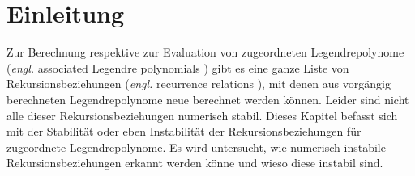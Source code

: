 %
%
%
\section{Einleitung\label{legendre:section:einleitung}}
Zur Berechnung respektive zur Evaluation von zugeordneten Legendrepolynome (\textit{engl.} associated Legendre polynomials ) gibt es eine ganze Liste von Rekursionsbeziehungen (\textit{engl.} recurrence relations ), mit denen aus vorgängig berechneten Legendrepolynome neue berechnet werden können.
Leider sind nicht alle dieser Rekursionsbeziehungen numerisch stabil.
Dieses Kapitel befasst sich mit der Stabilität oder eben Instabilität der Rekursionsbeziehungen für zugeordnete Legendrepolynome.
Es wird untersucht, wie numerisch instabile Rekursionsbeziehungen erkannt werden könne und wieso diese instabil sind.







